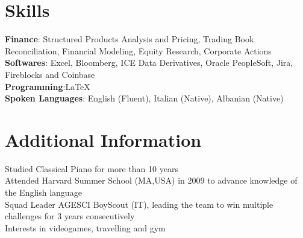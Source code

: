 \documentclass[letterpaper,11pt]{article}
\begin{document}
\section{Skills}
 \begin{itemize}[leftmargin=0.15in, label={}]
    \small{\item{
     \textbf{Finance}{: Structured Products Analysis and Pricing, Trading Book Reconciliation, Financial Modeling, Equity Research, Corporate Actions} \\
     \textbf{Softwares}{: Excel, Bloomberg, ICE Data Derivatives, Oracle PeopleSoft, Jira, Fireblocks and Coinbase} \\
     \textbf{Programming}{:\LaTeX} \\
     \textbf{Spoken Languages}{: English (Fluent), Italian (Native), Albanian (Native)}
    }}
 \end{itemize}

\section{Additional Information}
\begin{itemize}[leftmargin=0.15in, label={}]
   \small{\item{
    {Studied Classical Piano for more than 10 years} \\
    {Attended Harvard Summer School (MA,USA) in 2009 to advance knowledge of the English language} \\
    {Squad Leader AGESCI BoyScout (IT), leading the team to win multiple challenges for 3 years consecutively} \\
    {Interests in videogames, travelling and gym}
   }} 
\end{itemize}
\end{document}
